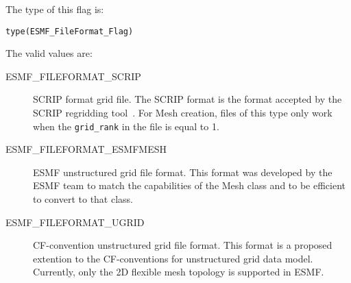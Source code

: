 The type of this flag is:

{\tt type(ESMF\_FileFormat\_Flag)}

The valid values are:
\begin{description}
\item [ESMF\_FILEFORMAT\_SCRIP] SCRIP format grid file. The SCRIP format is the format accepted by the SCRIP regridding tool~\cite{ref:SCRIP}.   For Mesh creation, files of this type only work when the {\tt grid\_rank} in the file is equal to 1.

\item [ESMF\_FILEFORMAT\_ESMFMESH] ESMF unstructured grid file format. This format was developed by the ESMF team to match the capabilities of the Mesh class and to be efficient to convert to that class. 

\item [ESMF\_FILEFORMAT\_UGRID] CF-convention unstructured grid file format. This format is a proposed extention to the 
CF-conventions for unstructured grid data model. Currently, only the 2D flexible mesh topology is supported in ESMF.
\end{description}


